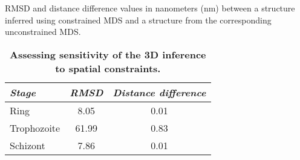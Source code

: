 \documentclass{article}
\begin{document}
\begin{table}[ht!]
\caption{{\bf Assessing sensitivity of the 3D inference to spatial constraints.}}
{RMSD and distance difference values in nanometers (nm) between a structure inferred
using constrained MDS and a structure from the corresponding unconstrained MDS.}
\vspace{15pt}
\begin{center}
\begin{tabular}{lcc}
\hline
\emph{Stage} & \emph{RMSD} & \emph{Distance difference} \\
\hline
Ring & 8.05 & 0.01\\
Trophozoite & 61.99 & 0.83\\
Schizont & 7.86 & 0.01\\
\hline
\end{tabular}
\end{center}
\label{table:stabilityToConstraints}
\end{table}
\clearpage
\end{document}
